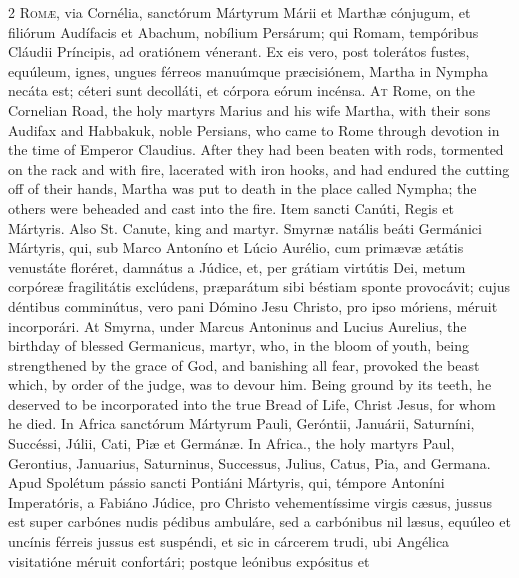\begin{paracol}{2}
\lettrine[lines=2]{R}{omæ,} via Cornélia, sanctórum Mártyrum Márii et 
 Marthæ cónjugum, et filiórum Audífacis et Abachum, nobílium Persárum; qui 
 Romam, tempóribus Cláudii Príncipis, ad oratiónem vénerant. Ex eis 
 vero, post tolerátos fustes, equúleum, ignes, ungues férreos manuúmque 
 præcisiónem, Martha in Nympha necáta est; céteri sunt decolláti, et córpora 
 eórum incénsa.
\switchcolumn
{}
\lettrine[lines=2]{A}{t} Rome, on the Cornelian Road, the holy martyrs Marius and his wife Martha, 
 with their sons Audifax and Habbakuk, noble Persians, who came to Rome 
 through devotion in the time of Emperor Claudius. After they had been 
 beaten with rods, tormented on the rack and with fire, lacerated with iron 
 hooks, and had endured the cutting off of their hands, Martha was put to 
 death in the place called Nympha; the others were beheaded and cast into the 
 fire.
\switchcolumn*
{}
Item sancti Canúti, Regis et Mártyris.
\switchcolumn
{}
Also St. Canute, king and martyr.
\switchcolumn*
{}
Smyrnæ natális beáti Germánici Mártyris, qui, 
 sub Marco Antoníno et Lúcio Aurélio, cum primævæ ætátis venustáte floréret, 
 damnátus a Júdice, et, per grátiam virtútis Dei, metum corpóreæ fragilitátis 
 exclúdens, præparátum sibi béstiam sponte provocávit; cujus déntibus 
 comminútus, vero pani Dómino Jesu Christo, pro ipso móriens, méruit incorporári.
\switchcolumn
{}
At Smyrna, under Marcus Antoninus and Lucius Aurelius, the birthday of 
 blessed Germanicus, martyr, who, in the bloom of youth, being strengthened 
 by the grace of God, and banishing all fear, provoked the beast which, by 
 order of the judge, was to devour him. Being ground by its teeth, he 
 deserved to be incorporated into the true Bread of Life, Christ Jesus, for 
 whom he died.
\switchcolumn*
{}
In Africa sanctórum Mártyrum Pauli, Geróntii, Januárii, Saturníni, Succéssi, 
 Júlii, Cati, Piæ et Germánæ.
\switchcolumn
{}
In Africa., the holy martyrs Paul, Gerontius, Januarius, Saturninus, 
 Successus, Julius, Catus, Pia, and Germana.
\switchcolumn*
{}
Apud Spolétum pássio sancti Pontiáni Mártyris, qui, témpore Antoníni 
 Imperatóris, a Fabiáno Júdice, pro Christo vehementíssime virgis cæsus, 
 jussus est super carbónes nudis pédibus ambuláre, sed a carbónibus nil læsus, 
 equúleo et uncínis férreis jussus est suspéndi, et sic in cárcerem trudi, 
 ubi Angélica visitatióne méruit confortári; postque leónibus expósitus et 

\end{paracol}
